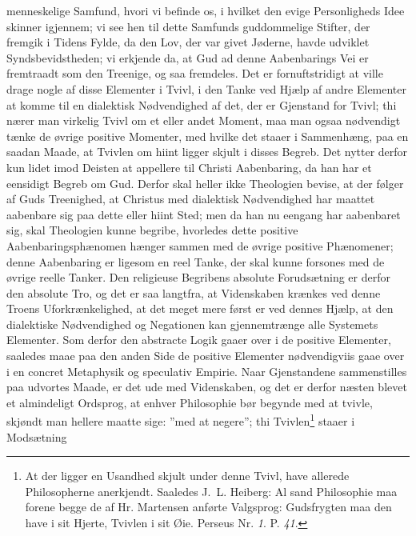 \documentclass[12pt]{book}
\newcommand{\opage}[1]{\marginnote{\footnotesize\textit{[#1]}}}
\begin{document}
menneskelige Samfund, hvori vi befinde os, i hvilket den evige Personligheds Idee
skinner igjennem; vi see hen til dette Samfunds guddommelige Stifter, der
fremgik i Tidens Fylde, da den Lov, der var givet Jøderne, havde udviklet
Syndsbevidstheden; vi erkjende da, at Gud ad denne Aabenbarings Vei er fremtraadt
som den Treenige, og saa fremdeles. Det er fornuftstridigt at ville drage nogle
af disse Elementer i Tvivl, i den Tanke ved Hjælp af andre Elementer at komme til
en dialektisk Nødvendighed af det,
\opage{146} \setcounter{footnote}{0}%
der er Gjenstand for Tvivl; thi nærer man virkelig Tvivl om et eller andet
Moment, maa man ogsaa nødvendigt tænke de øvrige positive Momenter, med hvilke
det staaer i Sammenhæng, paa en saadan Maade, at Tvivlen om hiint ligger skjult i
disses Begreb. Det nytter derfor kun lidet imod Deisten at appellere til Christi
Aabenbaring, da han har et eensidigt Begreb om Gud. Derfor skal heller ikke
Theologien bevise, at der følger af Guds Treenighed, at Christus med dialektisk
Nødvendighed har maattet aabenbare sig paa dette eller hiint Sted; men da han nu
eengang har aabenbaret sig, skal Theologien kunne begribe, hvorledes dette
positive Aabenbaringsphænomen hænger sammen med de øvrige positive Phænomener;
denne Aabenbaring er ligesom en reel Tanke, der skal kunne forsones med de øvrige
reelle Tanker. Den religieuse Begribens absolute Forudsætning er derfor den
absolute Tro, og det er saa langtfra, at Videnskaben krænkes ved denne Troens
Uforkrænkelighed, at det meget mere først er ved dennes Hjælp, at den dialektiske
Nødvendighed og Negationen kan gjennemtrænge alle Systemets Elementer. Som derfor
den abstracte Logik gaaer over i de positive Elementer, saaledes maae paa den
anden Side de positive Elementer nødvendigviis gaae over i en concret Metaphysik
og speculativ Empirie. Naar Gjenstandene sammenstilles paa udvortes Maade, er det
ude med Videnskaben, og det er derfor næsten blevet et almindeligt Ordsprog, at
enhver Philosophie bør begynde med at tvivle, skjøndt man hellere maatte sige:
”med at negere”; thi Tvivlen\footnote{At der ligger en Usandhed skjult under
denne Tvivl, have allerede Philosopherne anerkjendt. Saaledes J.~L. Heiberg: Al
sand Philosophie maa forene begge de af Hr. Martensen anførte Valgsprog:
Gudsfrygten maa den have i sit Hjerte, Tvivlen i sit Øie. Perseus Nr. \textit{1}.
P. \textit{41}.} staaer i Modsætning
\end{document}

